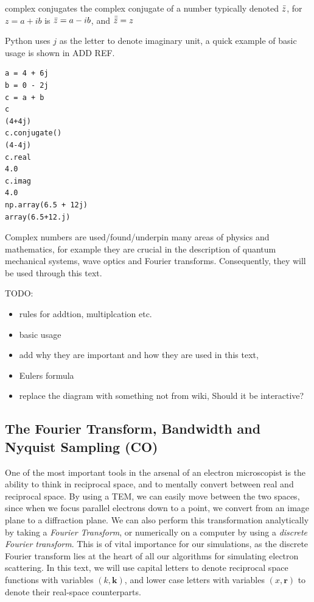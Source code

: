 \documentclass[%
 superscriptaddress,
 aip,
 amsmath,amssymb,
preprint,%
 author-year,%
longbibliography
]{revtex4-2}
\begin{document}
complex conjugates
the complex conjugate of a number typically denoted $\Bar{z}$,  for $z = a + ib$ is $\Bar{z} = a - ib$, and $\Bar{\Bar{z}} = z$

Python uses $j$ as the letter to denote imaginary unit, a quick example of basic usage is shown in ADD REF.

\begin{lstlisting}[caption=Basic use of complex numbers in Python syntax]
a = 4 + 6j
b = 0 - 2j
c = a + b 
c 
(4+4j) 
c.conjugate()
(4-4j)
c.real
4.0
c.imag
4.0
np.array(6.5 + 12j)
array(6.5+12.j)
\end{lstlisting}

Complex numbers are used/found/underpin many areas of physics and mathematics, for example they are crucial in the description of quantum mechanical systems, wave optics and Fourier transforms. Consequently, they will be used through this text. 

TODO:
\begin{itemize}
  \item rules for addtion, multiplcation etc.
  \item basic usage
  \item add why they are important and how they are used in this text,
  \item Eulers formula 
  \item replace the diagram with something not from wiki, Should it be interactive?
\end{itemize}



\subsection*{The Fourier Transform, Bandwidth and Nyquist Sampling (CO)}

One of the most important tools in the arsenal of an electron microscopist is the ability to think in reciprocal space, and to mentally convert between real and reciprocal space. By using a TEM, we can easily move between the two spaces, since when we focus parallel electrons down to a point, we convert from an image plane to a diffraction plane. We can also perform this transformation analytically by taking a \emph{Fourier Transform}, or numerically on a computer by using a \emph{discrete Fourier transform}. This is of vital importance for our simulations, as the discrete Fourier transform lies at the heart of all our algorithms for simulating electron scattering. In this text, we will use capital letters to denote reciprocal space functions with variables $(k, \bm{k})$, and lower case letters with variables $(x, \bm{r})$ to denote their real-space counterparts.
\end{document}
